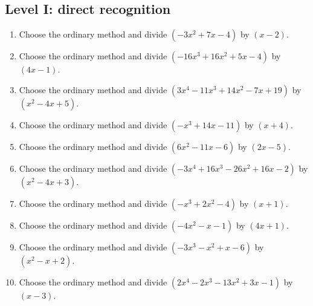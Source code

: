 \documentclass[11pt,oneside]{book}
\begin{document}
\subsection*{Level I: direct recognition}
\begin{enumerate}[leftmargin=*,label=\textbf{\arabic*.},itemsep=0.65\baselineskip]
\item Choose the ordinary method and divide $(- 3 x^{2} + 7 x - 4)$ by $(x - 2)$.
\item Choose the ordinary method and divide $(- 16 x^{3} + 16 x^{2} + 5 x - 4)$ by $(4 x - 1)$.
\item Choose the ordinary method and divide $(3 x^{4} - 11 x^{3} + 14 x^{2} - 7 x + 19)$ by $(x^{2} - 4 x + 5)$.
\item Choose the ordinary method and divide $(- x^{3} + 14 x - 11)$ by $(x + 4)$.
\item Choose the ordinary method and divide $(6 x^{2} - 11 x - 6)$ by $(2 x - 5)$.
\item Choose the ordinary method and divide $(- 3 x^{4} + 16 x^{3} - 26 x^{2} + 16 x - 2)$ by $(x^{2} - 4 x + 3)$.
\item Choose the ordinary method and divide $(- x^{3} + 2 x^{2} - 4)$ by $(x + 1)$.
\item Choose the ordinary method and divide $(- 4 x^{2} - x - 1)$ by $(4 x + 1)$.
\item Choose the ordinary method and divide $(- 3 x^{3} - x^{2} + x - 6)$ by $(x^{2} - x + 2)$.
\item Choose the ordinary method and divide $(2 x^{4} - 2 x^{3} - 13 x^{2} + 3 x - 1)$ by $(x - 3)$.
\end{enumerate}
\end{document}
